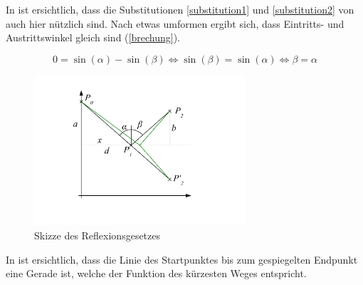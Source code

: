In  ist ersichtlich, dass die Substitutionen \ref{substitution1} und \ref{substitution2} von  auch hier nützlich sind.
Nach etwas umformen ergibt sich, dass Eintritts- und Austrittswinkel gleich sind (\eqref{brechung}).


\begin{equation}
0 = \sin(\alpha) - \sin(\beta) \Leftrightarrow \sin(\beta) = \sin(\alpha) \Leftrightarrow\beta = \alpha
\label{brechung}
\end{equation}

\begin{figure}[H]
\begin{center}
	\includegraphics[width=0.7\textwidth]{./picture/Spiegelung.pdf}
	\caption{Skizze des Reflexionsgesetzes}
	\label{Ab:spiegelung}
\end{center}
\end{figure}


In  ist ersichtlich, dass die Linie des Startpunktes bis zum 
gespiegelten Endpunkt eine Gerade ist, welche der Funktion des kürzesten Weges entspricht.
